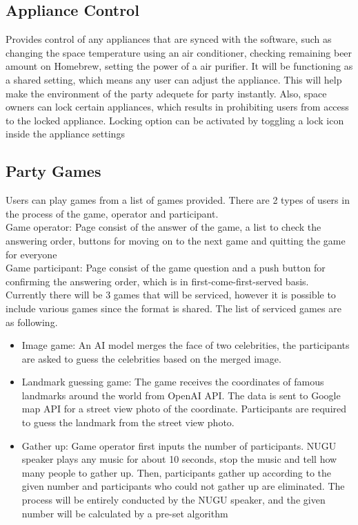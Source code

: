 \documentclass[conference]{IEEEtran}
\begin{document}
    \subsection{Appliance Control}
    Provides control of any appliances that are synced with the software, such as changing the space temperature using an air conditioner, checking remaining beer amount on Homebrew,  setting the power of a air purifier. It will be functioning as a shared setting, which means any user can adjust the appliance. This will help make the environment of the party adequete for party instantly. Also, space owners can lock certain appliances, which results in prohibiting users from access to the locked appliance. Locking option can be activated by toggling a lock icon inside the appliance settings

    \subsection{Party Games}
    Users can play games from a list of games provided. There are 2 types of users in the process of the game, operator and participant. \\
    
    Game operator: Page consist of the answer of the game, a list to check the answering order, buttons for moving on to the next game and quitting the game for everyone\\
    
    Game participant: Page consist of the game question and a push button for confirming the answering order, which is in first-come-first-served basis.\\
    
    Currently there will be 3 games that will be serviced, however it is possible to include various games since the format is shared. The list of serviced games are as following.\\

    \begin{itemize}
        \item Image game: An AI model merges the face of two celebrities, the participants are asked to guess the celebrities based on the merged image.
        \item Landmark guessing game: The game receives the coordinates of famous landmarks around the world from OpenAI API. The data is sent to Google map API for a street view photo of the coordinate. Participants are required to guess the landmark from the street view photo.
        \item Gather up: Game operator first inputs the number of participants. NUGU speaker plays any music for about 10 seconds, stop the music and tell how many people to gather up. Then, participants gather up according to the given number and participants who could not gather up are eliminated. The process will be entirely conducted by the NUGU speaker, and the given number will be calculated by a pre-set algorithm
    \end{itemize}
    
\end{document}

